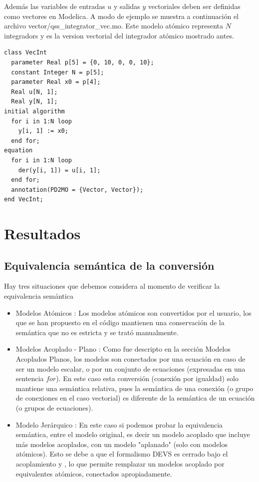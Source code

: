\documentclass[a4paper,	11pt]{report}
\begin{document}
Además las variables de entradas $u$ y salidas $y$ vectoriales deben ser definidas como vectores en Modelica. A modo de ejemplo se muestra a continuación el archivo vector/qss\_integrator\_vec.mo. Este modelo atómico representa $N$ integradors y es la version vectorial del integrador atómico mostrado antes.


\begin{verbatim}
class VecInt
  parameter Real p[5] = {0, 10, 0, 0, 10};
  constant Integer N = p[5];
  parameter Real x0 = p[4];
  Real u[N, 1];
  Real y[N, 1];
initial algorithm
  for i in 1:N loop
    y[i, 1] := x0;
  end for;
equation
  for i in 1:N loop
    der(y[i, 1]) = u[i, 1];
  end for;
  annotation(PD2MO = {Vector, Vector});
end VecInt;
\end{verbatim}


\chapter{Resultados}

\section{Equivalencia semántica de la conversión}
Hay tres situaciones que debemos considera al momento de verificar la equivalencia semántica
\begin{itemize}
\item Modelos Atómicos : Los modelos atómicos son convertidos por el usuario, los que se han propuesto en el código mantienen una conservación de la semántica que no es estricta y se trató manualmente. 
\item Modelos Acoplado - Plano : Como fue descripto en la sección Modelos Acoplados Planos, los modelos son conectados por una ecuación en caso de ser un modelo escalar, o por un conjunto de ecuaciones (expresadas en una sentencia $for$). En este caso esta conversión (conexión por igualdad) solo mantiene una semántica relativa, pues la semántica de una conexión (o grupo de conexiones en el caso vectorial) es diferente de la semántica de un ecuación (o grupos de ecuaciones).

\item Modelo Jerárquico : En este caso si podemos probar la equivalencia semántica, entre el modelo original, es decir un modelo acoplado que incluye más modelos acoplados, con un modelo "aplanado" (solo con modelos atómicos). Esto se debe a que el formalismo DEVS es cerrado bajo el acoplamiento \cite{Zeigler:2000:TMS:580780} y \cite{zeigler1984multifacetted}, lo que permite remplazar un modelos acoplado por equivalentes atómicos, conectados apropiadamente. %
\end{itemize}
\end{document}
